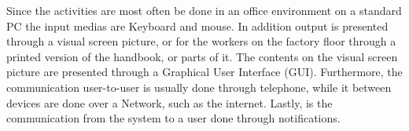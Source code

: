 Since the activities are most often be done in an office environment on a standard PC the input medias are Keyboard and mouse.
In addition output is presented through a visual screen picture, or for the workers on the factory floor through a printed version of the handbook, or parts of it.
The contents on the visual screen picture are presented through a Graphical User Interface (GUI).
Furthermore, the communication user-to-user is usually done through telephone, while it between devices are done over a Network, such as the internet.
Lastly, is the communication from the system to a user done through notifications.
